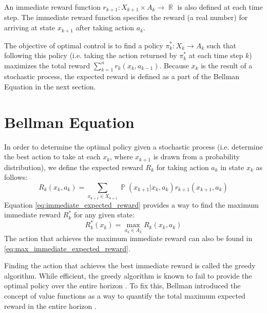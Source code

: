 \documentclass[conference]{IEEEtran}
\DeclareMathOperator*{\E}{\mathbb{E}}
\DeclareMathOperator*{\R}{\mathbb{R}}
\DeclareMathOperator*{\Prob}{\mathbb{P}}
\begin{document}
An immediate reward function $r_{k+1}: X_{k+1} \times A_k \rightarrow \R$ is also defined at each time step. The immediate reward function specifies the reward (a real number) for arriving at state $x_{k+1}$ after taking action $a_k$.

The objective of optimal control is to find a policy $\pi^*_k: X_k \rightarrow A_k$ such that following this policy (i.e. taking the action returned by $\pi^*_k$ at each time step $k$) maximizes the total reward $\sum_{k=1}^{n} r_k(x_k,a_{k-1})$. Because $x_k$ is the result of a stochastic process, the expected reward is defined as a part of the Bellman Equation in the next section.

\section{Bellman Equation}

In order to determine the optimal policy given a stochastic process (i.e. determine the best action to take at each $x_k$, where $x_{k+1}$ is drawn from a probability distribution), we define the expected reward $R_k$ for taking action $a_k$ in state $x_k$ as follows:
\begin{equation}
R_k(x_k,a_k)=\sum_{x_{k+1} \in X_{k+1}} \Prob(x_{k+1}|x_k,a_k) r_{k+1}(x_{k+1},a_k) \label{eq:immediate_expected_reward}
\end{equation}
Equation \eqref{eq:immediate_expected_reward} provides a way to find the maximum immediate reward $R^*_k$ for any given state:
\begin{equation}
R^*_k(x_k) = \max_{a_k \in A_k} R_k(x_k,a_k) \label{eq:max_immediate_expected_reward}
\end{equation}
The action that achieves the maximum immediate reward can also be found in \eqref{eq:max_immediate_expected_reward}.

Finding the action that achieves the best immediate reward is called the greedy algorithm. While efficient, the greedy algorithm is known to fail to provide the optimal policy over the entire horizon \cite{gutin2002traveling}. To fix this, Bellman introduced the concept of value functions as a way to quantify the total maximum expected reward in the entire horizon \cite{bellman1966dynamic}.
\end{document}
